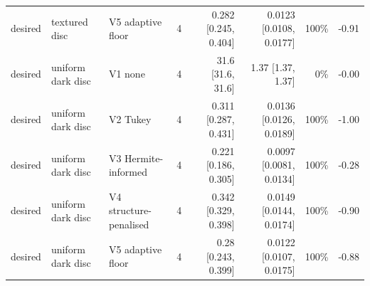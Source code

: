 \begin{tabular}{@{}lllrrrrr@{}}
desired & textured disc & V5 adaptive floor & 4 & 0.282 [0.245, 0.404] & 0.0123 [0.0108, 0.0177] & 100\% & -0.91 \\
desired & uniform dark disc & V1 none & 4 & 31.6 [31.6, 31.6] & 1.37 [1.37, 1.37] & 0\% & -0.00 \\
desired & uniform dark disc & V2 Tukey & 4 & 0.311 [0.287, 0.431] & 0.0136 [0.0126, 0.0189] & 100\% & -1.00 \\
desired & uniform dark disc & V3 Hermite-informed & 4 & 0.221 [0.186, 0.305] & 0.0097 [0.0081, 0.0134] & 100\% & -0.28 \\
desired & uniform dark disc & V4 structure-penalised & 4 & 0.342 [0.329, 0.398] & 0.0149 [0.0144, 0.0174] & 100\% & -0.90 \\
desired & uniform dark disc & V5 adaptive floor & 4 & 0.28 [0.243, 0.399] & 0.0122 [0.0107, 0.0175] & 100\% & -0.88 \\
\bottomrule
\end{tabular}

